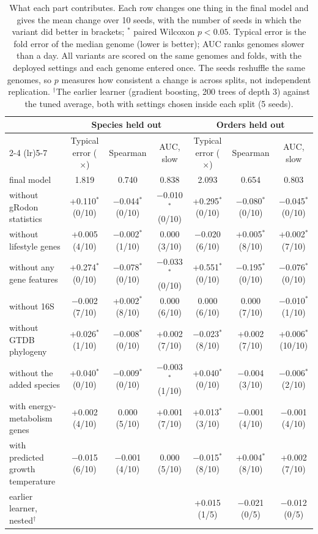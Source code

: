 \begin{table}[ht]\centering\scriptsize\setlength{\tabcolsep}{1.5pt}
\caption{What each part contributes. Each row changes one thing in the final model and gives the mean change over 10 seeds, with the number of seeds in which the variant did better in brackets; $^{*}$ paired Wilcoxon $p<0.05$. Typical error is the fold error of the median genome (lower is better); AUC ranks genomes slower than a day. All variants are scored on the same genomes and folds, with the deployed settings and each genome entered once. The seeds reshuffle the same genomes, so $p$ measures how consistent a change is across splits, not independent replication. $^{\dagger}$The earlier learner (gradient boosting, 200 trees of depth 3) against the tuned average, both with settings chosen inside each split (5 seeds).}\label{tab:ablations}
\begin{tabular}{lcccccc}
\toprule
& \multicolumn{3}{c}{Species held out} & \multicolumn{3}{c}{Orders held out} \\
\cmidrule(lr){2-4} \cmidrule(lr){5-7}
& Typical error ($\times$) & Spearman & AUC, slow & Typical error ($\times$) & Spearman & AUC, slow \\
\midrule
final model & 1.819 & 0.740 & 0.838 & 2.093 & 0.654 & 0.803 \\
\midrule
without gRodon statistics & +0.110$^{*}$ (0/10) & $-$0.044$^{*}$ (0/10) & $-$0.010$^{*}$ (0/10) & +0.295$^{*}$ (0/10) & $-$0.080$^{*}$ (0/10) & $-$0.045$^{*}$ (0/10) \\
without lifestyle genes & +0.005 (4/10) & $-$0.002$^{*}$ (1/10) & 0.000 (3/10) & $-$0.020 (6/10) & +0.005$^{*}$ (8/10) & +0.002$^{*}$ (7/10) \\
without any gene features & +0.274$^{*}$ (0/10) & $-$0.078$^{*}$ (0/10) & $-$0.033$^{*}$ (0/10) & +0.551$^{*}$ (0/10) & $-$0.195$^{*}$ (0/10) & $-$0.076$^{*}$ (0/10) \\
without 16S & $-$0.002 (7/10) & +0.002$^{*}$ (8/10) & 0.000 (6/10) & 0.000 (6/10) & 0.000 (7/10) & $-$0.010$^{*}$ (1/10) \\
without GTDB phylogeny & +0.026$^{*}$ (1/10) & $-$0.008$^{*}$ (0/10) & +0.002 (7/10) & $-$0.023$^{*}$ (8/10) & +0.002 (7/10) & +0.006$^{*}$ (10/10) \\
without the added species & +0.040$^{*}$ (0/10) & $-$0.009$^{*}$ (0/10) & $-$0.003$^{*}$ (1/10) & +0.040$^{*}$ (0/10) & $-$0.004 (3/10) & $-$0.006$^{*}$ (2/10) \\
with energy-metabolism genes & +0.002 (4/10) & 0.000 (5/10) & +0.001 (7/10) & +0.013$^{*}$ (3/10) & $-$0.001 (4/10) & $-$0.001 (4/10) \\
with predicted growth temperature & $-$0.015 (6/10) & $-$0.001 (4/10) & 0.000 (5/10) & $-$0.015$^{*}$ (8/10) & +0.004$^{*}$ (8/10) & +0.002 (7/10) \\
earlier learner, nested$^{\dagger}$ & & & & +0.015 (1/5) & $-$0.021 (0/5) & $-$0.012 (0/5) \\
\bottomrule
\end{tabular}
\end{table}

